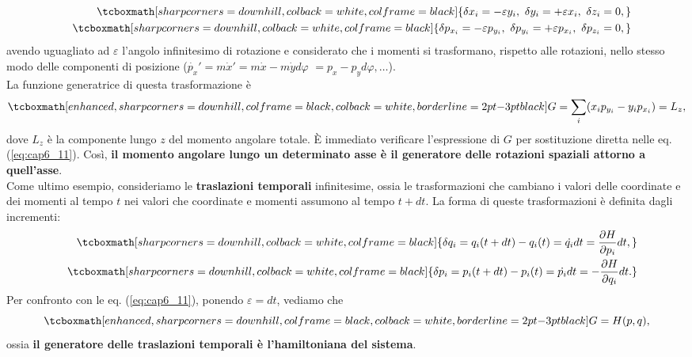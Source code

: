 \documentclass[a4paper,12pt,oneside]{book}
\begin{document}
	\begin{eqnarray}
			& & \tcboxmath[sharp corners=downhill, colback=white, colframe=black]{\delta x_i = -\varepsilon y_i, \ \delta y_i = +\varepsilon x_i, \ \delta z_i =0,}\\
			& &\tcboxmath[sharp corners=downhill, colback=white, colframe=black]{ \delta p_{x_i} = -\varepsilon p_{y_i}, \ \delta p_{y_i} = +\varepsilon p_{x_i}, \ \delta p_{z_i} =0,}
	\end{eqnarray}
avendo uguagliato ad $\varepsilon$ l'angolo infinitesimo di rotazione e considerato che i momenti si trasformano, rispetto alle rotazioni, nello stesso modo delle componenti di posizione ($\dot{p_x}'= m \dot{x}'=  m\dot{x}-m\dot{y}d\varphi$ $=p_x-p_yd\varphi , \dots$).\\
La funzione generatrice di questa trasformazione è
	\begin{equation}
		\tcboxmath[enhanced, sharp corners=downhill, colframe=black, colback=white, borderline={2pt}{-3pt}{black}]{
			G= \sum _i (x_ip_{y_i} - y_i p_{x_i}) = L_z ,
			}
	\end{equation}
dove $L_z$ è la componente lungo $z$ del momento angolare totale. È immediato verificare l'espressione di $G$ per sostituzione diretta nelle eq. (\ref{eq:cap6_11}). Così, \textbf{il momento angolare lungo un determinato asse è il generatore delle rotazioni spaziali attorno a quell'asse}.\\

Come ultimo esempio, consideriamo le \textbf{traslazioni temporali} infinitesime, ossia le trasformazioni che cambiano i valori delle coordinate e dei momenti al tempo $t$ nei valori che coordinate e momenti assumono al tempo $t+dt$. La forma di queste trasformazioni è definita dagli incrementi:
	\begin{eqnarray}
		& &\tcboxmath[sharp corners=downhill, colback=white, colframe=black]{
			\delta q_i = q_i(t+dt)-q_i(t) = \dot{q_i} dt = \frac{\partial H}{\partial p_i}dt,} \\
		& &\tcboxmath[sharp corners=downhill, colback=white, colframe=black]{
			\delta p_i = p_i(t+dt)-p_i(t) = \dot{p_i} dt = -\frac{\partial H}{\partial q_i}dt. }
	\end{eqnarray}
Per confronto con le eq. (\ref{eq:cap6_11}), ponendo $\varepsilon = dt$, vediamo che
	\begin{equation}
		\tcboxmath[enhanced, sharp corners=downhill, colframe=black, colback=white, borderline={2pt}{-3pt}{black}]{
			G=H(p,q) ,
			}
	\end{equation}
ossia \textbf{il generatore delle traslazioni temporali è l'hamiltoniana del sistema}.\\
\end{document}
